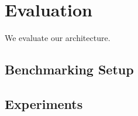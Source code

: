 \chapter{Evaluation}
\label{chapter:evaluation}

We evaluate our architecture.

\section{Benchmarking Setup}
\label{sec:benchmarkSetup}


\section{Experiments}
\label{sec:experiments}